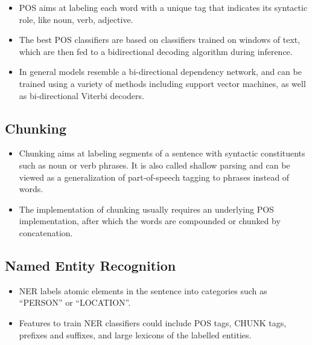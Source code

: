 \documentclass[11pt,a4paper]{article}
\begin{document}
    \begin{itemize}
      \item 
      POS aims at labeling each word with a unique tag that indicates its syntactic role, like noun, verb, adjective.
      \item 
      The best POS classifiers are based on classifiers trained on windows of text, which are then fed to a bidirectional decoding algorithm during inference.
      \item 
      In general models resemble a bi-directional dependency network, and can be trained using a variety of methods including support vector machines, as well as bi-directional Viterbi decoders.
    \end{itemize}
  

  \subsection{Chunking} %
  \label{sub:chunking}

    \begin{itemize}
      \item 
      Chunking aims at labeling segments of a sentence with syntactic constituents such as noun or verb phrases. It is also called shallow parsing and can be viewed as a generalization of part-of-speech tagging to phrases instead of words.
      \item 
      The implementation of chunking usually requires an underlying POS implementation, after which the words are compounded or chunked by concatenation.
    \end{itemize}
  

  \subsection{Named Entity Recognition} %
  \label{sub:named_entity_recognition}
  
    \begin{itemize}
      \item 
      NER labels atomic elements in the sentence into categories such as “PERSON” or “LOCATION”.
      \item 
      Features to train NER classifiers could include POS tags, CHUNK tags, prefixes and suffixes, and large lexicons of the labelled entities. 
    \end{itemize}
\end{document}
